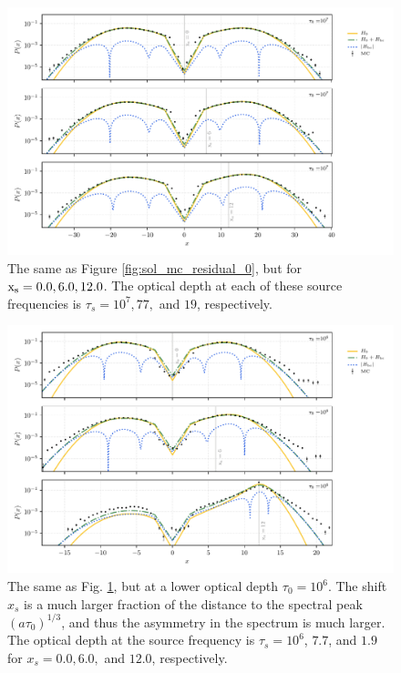 \documentclass[linenumbers]{aastex63}
\begin{document}
 \begin{figure}
    \centering
    \includegraphics[width=\textwidth]{xinit_threepanel.pdf}
    \caption{The same as Figure \ref{fig:sol_mc_residual_0}, but for $\rm x_s = 0.0, 6.0, 12.0$. The optical depth at each of these source frequencies is $\tau_s = 10^7, 77,$ and $19$, respectively.} 
    \label{fig:sol_mc_xinit}
\end{figure}

 \begin{figure}
    \centering
    \includegraphics[width=\textwidth]{xinit_threepanel_tau1e6.pdf}
    \caption{The same as Fig. \ref{fig:sol_mc_xinit}, but at a lower optical depth $\tau_0 = 10^6$. The shift $x_s$ is a much larger fraction of the distance to the spectral peak $(a\tau_0)^{1/3}$, and thus the asymmetry in the spectrum is much larger. The optical depth at the source frequency is $\tau_s = 10^6$, $7.7$, and $1.9$ for $x_s=0.0, 6.0,$ and $12.0$, respectively. } 
    \label{fig:sol_mc_xinit_lowtau}
\end{figure}
\end{document}
